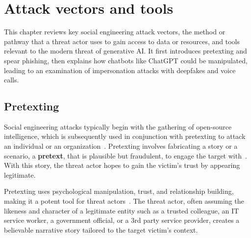 

\chapter{Attack vectors and tools\label{chapter:attacks}}
\begin{comment}
\end{comment}

This chapter reviews key social engineering attack vectors, the method or pathway that a threat actor uses to gain access to data or resources, and tools relevant to the modern threat of generative AI. It first introduces pretexting and spear phishing, then explains how chatbots like ChatGPT could be manipulated, leading to an examination of impersonation attacks with deepfakes and voice calls.




\section{Pretexting}
\begin{comment}
\end{comment}

%
%
Social engineering attacks typically begin with the gathering of open-source intelligence, which is subsequently used in conjunction with pretexting to attack an individual or an organization~\citep{hadnagy_Social_Engineering_The_Science_2018}. Pretexting involves fabricating a story or a scenario, a \textbf{pretext}, that is plausible but fraudulent, to engage the target with~\citep{wang_Defining_Social_Engineering_2020}. With this story, the threat actor hopes to gain the victim's trust by appearing legitimate. 

%
%
Pretexting uses psychological manipulation, trust, and relationship building, making it a potent tool for threat actors~\citep{mitnick_The_Art_of_Deception_2003}. The threat actor, often assuming the likeness and character of a legitimate entity such as a trusted colleague, an IT service worker, a government official, or a 3rd party service provider, creates a believable narrative story tailored to the target victim's context.

%
%







